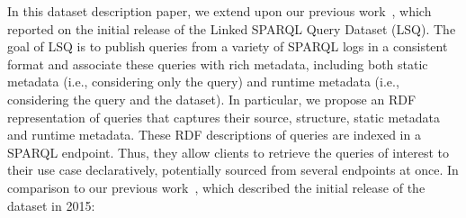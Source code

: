 In this dataset description paper, we extend upon our previous work~\cite{SaleemAHMN15}, which reported on the initial release of the Linked SPARQL Query Dataset (LSQ). The goal of LSQ is to publish queries from a variety of SPARQL logs in a consistent format and associate these queries with rich metadata, including both static metadata (i.e., considering only the query) and runtime metadata (i.e., considering the query and the dataset). In particular, we propose an RDF representation of queries that captures their source, structure, static metadata and runtime metadata. These RDF descriptions of queries are indexed in a SPARQL endpoint. Thus, they allow clients to retrieve the queries of interest to their use case declaratively, potentially sourced from several endpoints at once. In comparison to our previous work~\cite{SaleemAHMN15}, which described the initial release of the dataset in 2015:

